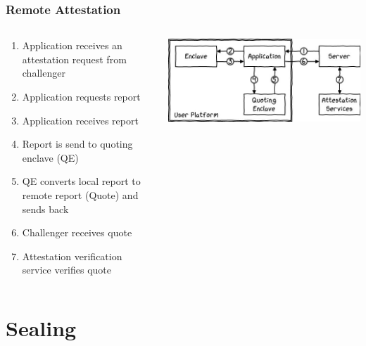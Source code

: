 
\begin{frame}
    \frametitle{Remote Attestation}
    \begin{columns}
        \begin{column}{0.4\textwidth}
            \begin{enumerate}[<+->]
                \item Application receives an attestation request from challenger
                \item Application requests report
                \item Application receives report
                \item Report is send to quoting enclave (QE)
                \item QE converts local report to remote report (Quote) and sends back
                \item Challenger receives quote
                \item Attestation verification service verifies quote
            \end{enumerate}
        \end{column}
        \begin{column}{0.6\textwidth}
            \includegraphics[scale=0.4]{Images/remote_attestation.png}
        \end{column}
    \end{columns}
\end{frame}

\section{Sealing}

